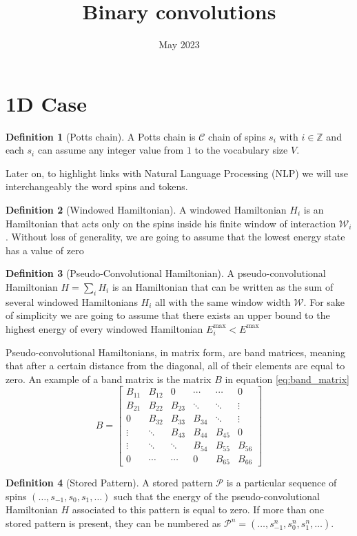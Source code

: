\documentclass{article}
\title{Binary convolutions}
\date{May 2023}
\theoremstyle{definition}
\newtheorem{definition}{Definition}[section]
\theoremstyle{remark}
\begin{document}
\section{1D Case}
\label{sec:1d}
\begin{definition}[Potts chain]
    A Potts chain is $\mathcal C$ chain of spins $s_i$ with $i \in \mathds{Z}$ and each $s_i$ can assume any integer value from $1$ to the vocabulary size $V$.
\end{definition}
Later on, to highlight links with Natural Language Processing (NLP) we will use interchangeably the word spins and tokens.
\begin{definition}[Windowed Hamiltonian]
    A windowed Hamiltonian $H_i$ is an Hamiltonian that acts only on the spins inside his finite window of interaction $\mathcal W_i$. Without loss of generality, we are going to assume that the lowest energy state has a value of zero
\end{definition}
\begin{definition}[Pseudo-Convolutional Hamiltonian]
    A pseudo-convolutional Hamiltonian $H=\sum_i H_i$ is an Hamiltonian that can be written as the sum of several windowed Hamiltonians $H_i$ all with the same window width $\mathcal W$. For sake of simplicity we are going to assume that there exists an upper bound to the highest energy of every windowed Hamiltonian $E^\textrm{max}_i<E^\textrm{max}$
\end{definition}
Pseudo-convolutional Hamiltonians, in matrix form, are band matrices, meaning that after a certain distance from the diagonal, all of their elements are equal to zero. An example of a band matrix is the matrix $B$ in equation \ref{eq:band_matrix}
\begin{equation}
\label{eq:band_matrix}
B=    
\begin{bmatrix}
 B_{11} & B_{12} & 0      & \cdots & \cdots & 0 \\
 B_{21} & B_{22} & B_{23} & \ddots & \ddots & \vdots \\
  0     & B_{32} & B_{33} & B_{34} & \ddots & \vdots \\
 \vdots & \ddots & B_{43} & B_{44} & B_{45} & 0 \\
 \vdots & \ddots & \ddots & B_{54} & B_{55} & B_{56} \\
 0      & \cdots & \cdots & 0      & B_{65} & B_{66}
\end{bmatrix}
\end{equation}

\begin{definition}[Stored Pattern]
    A stored pattern $\mathcal P$ is a particular sequence of spins $(\dots,s_{-1},s_0,s_1,\dots)$ such that the energy of the pseudo-convolutional Hamiltonian $H$ associated to this pattern is equal to zero. If more than one stored pattern is present, they can be numbered as $\mathcal P^n=(\dots,s^n_{-1},s^n_0,s^n_1,\dots)$.
\end{definition}
\end{document}
